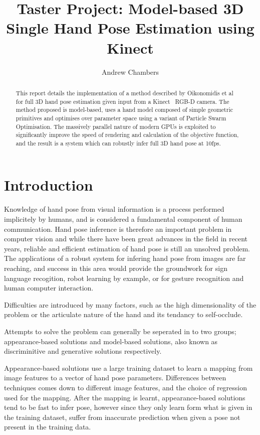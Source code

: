 \documentclass[10pt,a4paper,notitlepage,twocolumn]{report}
\date{}
\title{Taster Project: Model-based 3D Single Hand Pose Estimation using Kinect}
\author{Andrew Chambers}
\begin{document}
\maketitle

\begin{abstract}

  This report details the implementation of a method described by Oikonomidis et al~\cite{bmvc2011oikonom} for full 3D hand pose estimation given input from a Kinect~\cite{kinect} RGB-D camera.  The method proposed is model-based, uses a hand model composed of simple geometric primitives and optimises over parameter space using a variant of Particle Swarm Optimisation.  The massively parallel nature of modern GPUs is exploited to significantly improve the speed of rendering and calculation of the objective function, and the result is a system which can robustly infer full 3D hand pose at 10fps.

\end{abstract}

\section{Introduction}

Knowledge of hand pose from visual information is a process performed implicitely by humans, and is considered a fundamental component of human communication.  Hand pose inference is therefore an important problem in computer vision and while there have been great advances in the field in recent years, reliable and efficient estimation of hand pose is still an unsolved problem.  The applications of a robust system for infering hand pose from images are far reaching, and success in this area would provide the groundwork for sign language recogition, robot learning by example, or for gesture recognition and human computer interaction.

Difficulties are introduced by many factors, such as the high dimensionality of the problem or the articulate nature of the hand and its tendancy to self-occlude.   

Attempts to solve the problem can generally be seperated in to two groups; appearance-based solutions and model-based solutions, also known as discriminitive and generative solutions respectively.  

Appearance-based solutions use a large training dataset to learn a mapping from image features to a vector of hand pose parameters.  Differences between techniques comes down to different image features, and the choice of regression used for the mapping.  After the mapping is learnt, appearance-based solutions tend to be fast to infer pose, however since they only learn form what is given in the training dataset, suffer from inaccurate prediction when given a pose not present in the training data.
\end{document}
